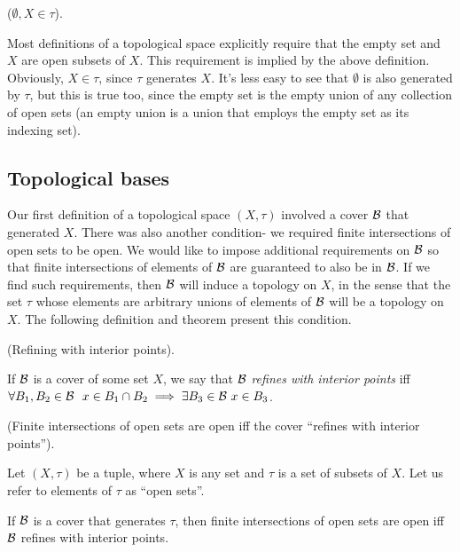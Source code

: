 \begin{remark}
     ($\emptyset, X \in \tau$).
     
     Most definitions of a topological space explicitly require that the empty set and $X$ are open subsets of $X$. This requirement is implied by the above definition. Obviously, $X \in \tau$, since $\tau$ generates $X$. It's less easy to see that $\emptyset$ is also generated by $\tau$, but this is true too, since the empty set is the empty union of any collection of open sets (an empty union is a union that employs the empty set as its indexing set).
\end{remark}

\newpage

\subsection*{Topological bases}

Our first definition of a topological space $(X, \tau)$ involved a cover $\mathcal{B}$ that generated $X$. There was also another condition- we required finite intersections of open sets to be open. We would like to impose additional requirements on $\mathcal{B}$ so that finite intersections of elements of $\mathcal{B}$ are guaranteed to also be in $\mathcal{B}$. If we find such requirements, then $\mathcal{B}$ will induce a topology on $X$, in the sense that the set $\tau$ whose elements are arbitrary unions of elements of $\mathcal{B}$ will be a topology on $X$. The following definition and theorem present this condition.

\begin{defn}
    (Refining with interior points).
    
    If $\mathcal{B}$ is a cover of some set $X$, we say that $\mathcal{B}$ \textit{refines with interior points} iff \\ ${\forall B_1, B_2 \in \mathcal{B} \text{ } \text{ } x \in B_1 \cap B_2 \implies \exists B_3 \in \mathcal{B} \text{ } x \in B_3}$.  
\end{defn}

\begin{theorem}
    (Finite intersections of open sets are open iff the cover ``refines with interior points'').
    
    Let $(X, \tau)$ be a tuple, where $X$ is any set and $\tau$ is a set of subsets of $X$. Let us refer to elements of $\tau$ as ``open sets''.
    
    If $\mathcal{B}$ is a cover that generates $\tau$, then finite intersections of open sets are open iff $\mathcal{B}$ refines with interior points.
\end{theorem}

